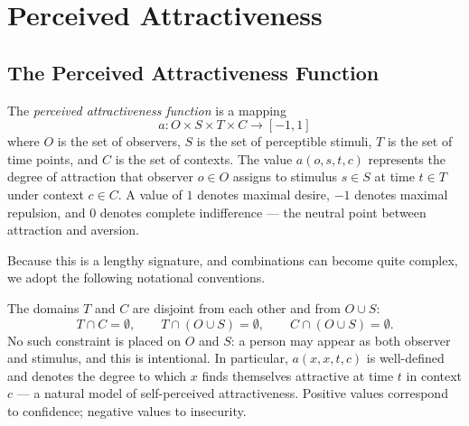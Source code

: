 \chapter{Perceived Attractiveness}

\section{The Perceived Attractiveness Function}

\begin{definition}
The \emph{perceived attractiveness function} is a mapping
\[
  a : O \times S \times T \times C \to [-1,1]
\]
where $O$ is the set of observers, $S$ is the set of perceptible stimuli, $T$ is the set of time points, and $C$ is the set of contexts.
The value $a(o, s, t, c)$ represents the degree of attraction that observer $o \in O$ assigns to stimulus $s \in S$ at time $t \in T$ under context $c \in C$.
A value of $1$ denotes maximal desire, $-1$ denotes maximal repulsion, and $0$ denotes complete indifference --- the neutral point between attraction and aversion.
\end{definition}

Because this is a lengthy signature, and combinations can become quite complex, we adopt the following notational conventions.

\begin{assumption}
The domains $T$ and $C$ are disjoint from each other and from $O \cup S$:
\[
  T \cap C = \emptyset, \qquad T \cap (O \cup S) = \emptyset, \qquad C \cap (O \cup S) = \emptyset.
\]
No such constraint is placed on $O$ and $S$: a person may appear as both observer and stimulus, and this is intentional.
In particular, $a(x, x, t, c)$ is well-defined and denotes the degree to which $x$ finds themselves attractive at time $t$ in context $c$ --- a natural model of self-perceived attractiveness.
Positive values correspond to confidence; negative values to insecurity.
\end{assumption}

